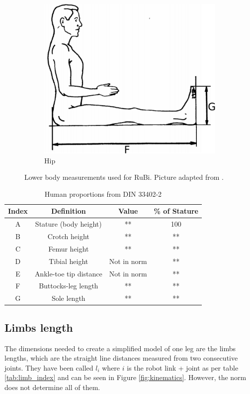 \begin{figure}[h]
\begin{subfigure}[b]{0.4\textwidth}
        \includegraphics[width=\textwidth]{figures/din_measurements2.pdf}
        \caption{Hip}
        \label{fig:din2}
    \end{subfigure}
	\caption{Lower body measurements used for RuBi. Picture adapted from \cite{din_measurements1}.}
	\label{fig:human_measurements}
\end{figure}


\begin{table}
\begin{center}
	\begin{tabular}{c | c | c | c}
	  Index & Definition & Value & \% of Stature \\
	  \hline
	  A & Stature (body height) & ** & 100 \\
	  B & Crotch height & ** & ** \\
	  C & Femur height & ** & ** \\
	  D & Tibial height & Not in norm & **\\
	  E & Ankle-toe tip distance & Not in norm & ** \\
	  F & Buttocks-leg length & ** & ** \\
	  G & Sole length & ** & **
	\end{tabular}
	\caption{Human proportions from DIN 33402-2}
	\label{tab:din_proportions}
\end{center}
\end{table}

\subsection{Limbs length} %
\label{sub:limbs_lengths}
The dimensions needed to create a simplified model of one leg are the limbs lengths, which are the straight line distances measured from two consecutive joints.
They have been called $l_{i}$ where $i$ is the robot link + joint as per table \ref{tab:limb_index} and can be seen in Figure \ref{fig:kinematics}.
However, the norm does not determine all of them.


